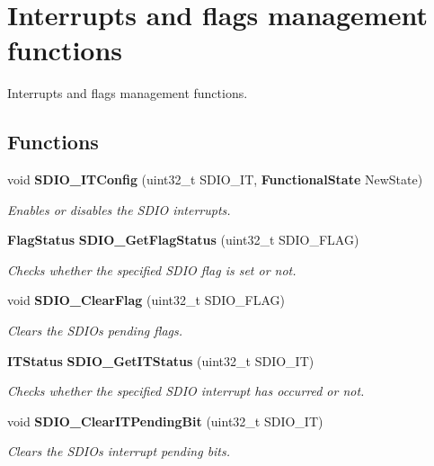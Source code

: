 \section{Interrupts and flags management functions}
\label{group__SDIO__Group7}


Interrupts and flags management functions.  


\subsection*{Functions}
\begin{DoxyCompactItemize}
\item 
void \textbf{ S\+D\+I\+O\+\_\+\+I\+T\+Config} (uint32\+\_\+t S\+D\+I\+O\+\_\+\+IT, \textbf{ Functional\+State} New\+State)
\begin{DoxyCompactList}\small\item\em Enables or disables the S\+D\+IO interrupts. \end{DoxyCompactList}\item 
\textbf{ Flag\+Status} \textbf{ S\+D\+I\+O\+\_\+\+Get\+Flag\+Status} (uint32\+\_\+t S\+D\+I\+O\+\_\+\+F\+L\+AG)
\begin{DoxyCompactList}\small\item\em Checks whether the specified S\+D\+IO flag is set or not. \end{DoxyCompactList}\item 
void \textbf{ S\+D\+I\+O\+\_\+\+Clear\+Flag} (uint32\+\_\+t S\+D\+I\+O\+\_\+\+F\+L\+AG)
\begin{DoxyCompactList}\small\item\em Clears the S\+D\+IO\textquotesingle{}s pending flags. \end{DoxyCompactList}\item 
\textbf{ I\+T\+Status} \textbf{ S\+D\+I\+O\+\_\+\+Get\+I\+T\+Status} (uint32\+\_\+t S\+D\+I\+O\+\_\+\+IT)
\begin{DoxyCompactList}\small\item\em Checks whether the specified S\+D\+IO interrupt has occurred or not. \end{DoxyCompactList}\item 
void \textbf{ S\+D\+I\+O\+\_\+\+Clear\+I\+T\+Pending\+Bit} (uint32\+\_\+t S\+D\+I\+O\+\_\+\+IT)
\begin{DoxyCompactList}\small\item\em Clears the S\+D\+IO\textquotesingle{}s interrupt pending bits. \end{DoxyCompactList}\end{DoxyCompactItemize}


